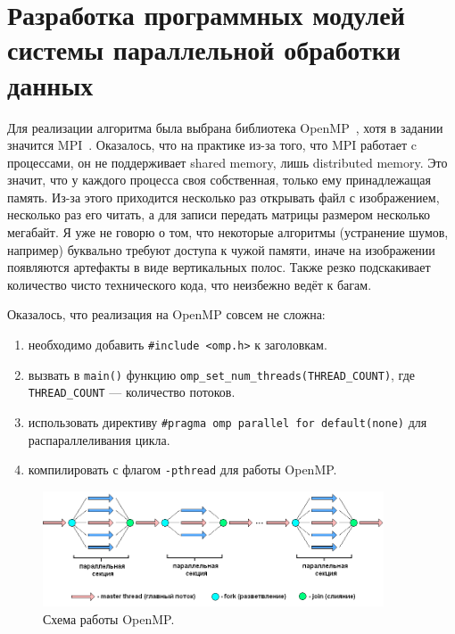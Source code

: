 \newpage


\section{Разработка программных модулей системы параллельной обработки данных}
Для реализации алгоритма была выбрана библиотека OpenMP~\cite{OpenMPManual}, хотя в задании значится MPI~\cite{MPIManual}.%
Оказалось, что на практике из-за того, что MPI работает c процессами, он не поддерживает shared memory, лишь distributed memory.
Это значит, что у каждого процесса своя собственная, только ему принадлежащая память.
Из-за этого приходится несколько раз открывать файл с изображением, несколько раз его читать, а для записи передать матрицы размером несколько мегабайт.
Я уже не говорю о том, что некоторые алгоритмы (устранение шумов, например) буквально требуют доступа к чужой памяти, иначе на изображении появляются артефакты в виде вертикальных полос.
Также резко подскакивает количество чисто технического кода, что неизбежно ведёт к багам.

Оказалось, что реализация на OpenMP совсем не сложна:
\begin{enumerate}
    \item необходимо добавить \texttt{\#include <omp.h>} к заголовкам.
    \item вызвать в \texttt{main()} функцию \texttt{omp\_set\_num\_threads(THREAD\_COUNT)}, где \texttt{THREAD\_COUNT} --- количество потоков.
    \item использовать директиву \texttt{\#pragma omp parallel for default(none)} для распараллеливания цикла.
    \item компилировать с флагом \texttt{-pthread} для работы OpenMP.%
\end{enumerate}%

\begin{figure}[h]
    \begin{center}
        \includegraphics[width=0.9\textwidth]{../resources/openMP}
    \end{center}
    \caption{Схема работы OpenMP.}
\end{figure}
